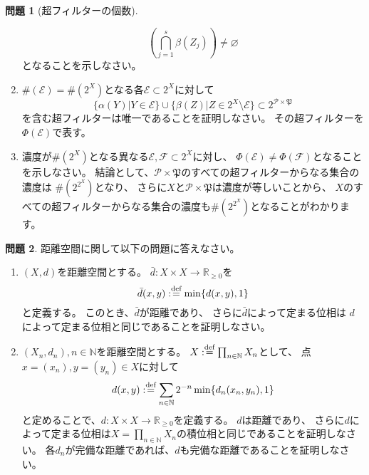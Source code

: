\documentclass[uplatex]{jsarticle}
\theoremstyle{definition}
\newtheorem{prob}[prob]{問題}
\renewcommand{\emptyset}{\varnothing}
\newcommand{\dfn}{:\overset{\mbox{{\scriptsize def}}}{=}}
\newcommand{\R}{\mathbb{R}}
\newcommand{\N}{\mathbb{N}}
\newcommand{\mcE}{\mathcal{E}}
\newcommand{\mcF}{\mathcal{F}}
\newcommand{\mcP}{\mathcal{P}}
\begin{document}
\begin{prob}[超フィルターの個数]
\begin{enumerate}[start=3]
\[    \left( \bigcap_{j=1}^s \beta(Z_j)\right) \neq \emptyset
    \]
    となることを示しなさい。
    \item
    \(\#(\mcE) = \#(2^X)\)となる各\(\mcE\subset 2^X\)に対して
    \[
    \{ \alpha(Y) | Y\in \mcE\} \cup \{ \beta(Z) | Z\in 2^X \setminus \mcE\}
    \subset 2^{\mcP\times \mathfrak{P}}
    \]
    を含む超フィルターは唯一であることを証明しなさい。
    その超フィルターを\(\Phi(\mcE)\)で表す。
    \item
    濃度が\(\#(2^X)\)となる異なる\(\mcE, \mcF \subset 2^X\)に対し、
    \(\Phi(\mcE)\neq \Phi(\mcF)\)となることを示しなさい。
    結論として、\(\mcP \times \mathfrak{P}\)のすべての超フィルターからなる集合の濃度は
    \(\#(2^{2^X})\)となり、
    さらに\(X\)と\(\mcP \times \mathfrak{P}\)は濃度が等しいことから、
    \(X\)のすべての超フィルターからなる集合の濃度も\(\#(2^{2^X})\)となることがわかります。
  \end{enumerate}
\end{prob}






\begin{prob}\label{met cut 1}
  距離空間に関して以下の問題に答えなさい。
  \begin{enumerate}
    \item
    \((X,d)\)を距離空間とする。
    \(\bar{d}:X\times X \to \R_{\geq 0}\)を
    \[
    \bar{d}(x,y) \dfn \min\{d(x,y),1\}
    \]
    と定義する。
    このとき、\(\bar{d}\)が距離であり、
    さらに\(\bar{d}\)によって定まる位相は
    \(d\)によって定まる位相と同じであることを証明しなさい。
    \item \label{met prod infinite}
    \((X_n,d_n),n\in \N\)を距離空間とする。
    \(X\dfn \prod_{n\in \N}X_n\)として、
    点\(x=(x_n), y=(y_n)\in X\)に対して
    \[
    d(x,y) \dfn \sum_{n\in \N} 2^{-n}\min\{d_n(x_n,y_n),1\}
    \]
    と定めることで、\(d:X\times X \to \R_{\geq 0}\)を定義する。
    \(d\)は距離であり、
    さらに\(d\)によって定まる位相は\(X = \prod_{n\in \N}X_n\)の積位相と同じであることを証明しなさい。
    各\(d_n\)が完備な距離であれば、\(d\)も完備な距離であることを証明しなさい。
  \end{enumerate}
\end{prob}
\end{document}
